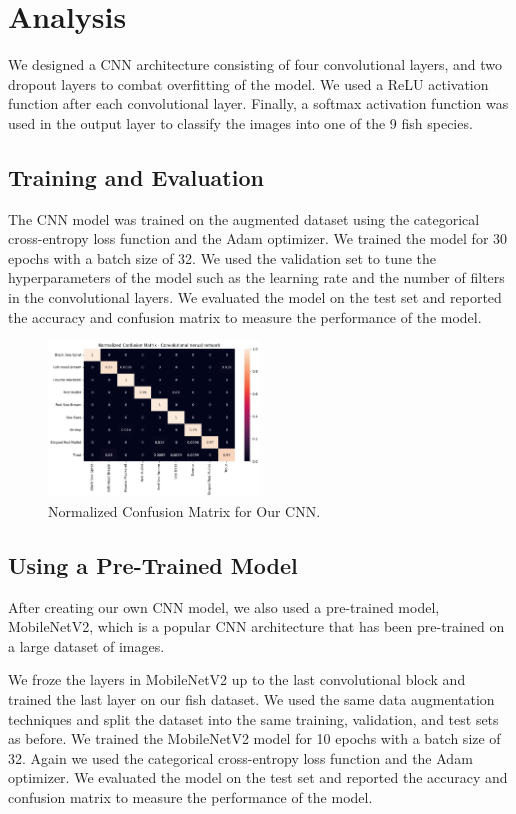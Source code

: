 \documentclass[a4paper, twocolumn]{article}
\begin{document}
\section{Analysis}\label{sec: Analysis}
We designed a CNN architecture consisting of four convolutional layers, and two dropout layers to combat overfitting of the model. We used a ReLU activation function after each convolutional layer. Finally, a softmax activation function was used in the output layer to classify the images into one of the 9 fish species.

\subsection{Training and Evaluation}\label{sec: Training and Evaluation}
The CNN model was trained on the augmented dataset using the categorical cross-entropy loss function and the Adam optimizer. We trained the model for 30 epochs with a batch size of 32. We used the validation set to tune the hyperparameters of the model such as the learning rate and the number of filters in the convolutional layers. We evaluated the model on the test set and reported the accuracy and confusion matrix to measure the performance of the model.

\begin{figure}[h]
\centering
\includegraphics[width=0.5\textwidth]{figures/confusion_matrix_CCN.png}
\caption{Normalized Confusion Matrix for Our CNN.}
\label{fig:example}
\end{figure}

\subsection{Using a Pre-Trained Model}\label{sec: Using a Pre-Trained Model}
After creating our own CNN model, we also used a pre-trained model, MobileNetV2, which is a popular CNN architecture that has been pre-trained on a large dataset of images.
\cite{9422058}

We froze the layers in MobileNetV2 up to the last convolutional block and trained the last layer on our fish dataset. We used the same data augmentation techniques and split the dataset into the same training, validation, and test sets as before. We trained the MobileNetV2 model for 10 epochs with a batch size of 32. Again we used the categorical cross-entropy loss function and the Adam optimizer. We evaluated the model on the test set and reported the accuracy and confusion matrix to measure the performance of the model.
\end{document}
